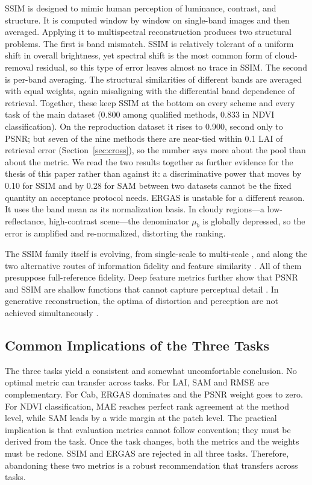 \documentclass[a4paper,fleqn]{cas-dc}
\begin{document}
SSIM is designed to mimic human perception of luminance, contrast, and structure. It is computed window by window on single-band images and then averaged. Applying it to multispectral reconstruction produces two structural problems. The first is band mismatch. SSIM is relatively tolerant of a uniform shift in overall brightness, yet spectral shift is the most common form of cloud-removal residual, so this type of error leaves almost no trace in SSIM. The second is per-band averaging. The structural similarities of different bands are averaged with equal weights, again misaligning with the differential band dependence of retrieval. Together, these keep SSIM at the bottom on every scheme and every task of the main dataset (0.800 among qualified methods, 0.833 in NDVI classification). On the reproduction dataset it rises to 0.900, second only to PSNR; but seven of the nine methods there are near-tied within 0.1 LAI of retrieval error (Section~\ref{sec:cross}), so the number says more about the pool than about the metric. We read the two results together as further evidence for the thesis of this paper rather than against it: a discriminative power that moves by 0.10 for SSIM and by 0.28 for SAM between two datasets cannot be the fixed quantity an acceptance protocol needs. ERGAS is unstable for a different reason. It uses the band mean as its normalization basis. In cloudy regions---a low-reflectance, high-contrast scene---the denominator $\mu_b$ is globally depressed, so the error is amplified and re-normalized, distorting the ranking.

The SSIM family itself is evolving, from single-scale \cite{ref27} to multi-scale \cite{ref34}, and along the two alternative routes of information fidelity \cite{ref35} and feature similarity \cite{ref36}. All of them presuppose full-reference fidelity. Deep feature metrics further show that PSNR and SSIM are shallow functions that cannot capture perceptual detail \cite{ref4}. In generative reconstruction, the optima of distortion and perception are not achieved simultaneously \cite{ref33}.

\subsection{Common Implications of the Three Tasks}

The three tasks yield a consistent and somewhat uncomfortable conclusion. No optimal metric can transfer across tasks. For LAI, SAM and RMSE are complementary. For Cab, ERGAS dominates and the PSNR weight goes to zero. For NDVI classification, MAE reaches perfect rank agreement at the method level, while SAM leads by a wide margin at the patch level. The practical implication is that evaluation metrics cannot follow convention; they must be derived from the task. Once the task changes, both the metrics and the weights must be redone. SSIM and ERGAS are rejected in all three tasks. Therefore, abandoning these two metrics is a robust recommendation that transfers across tasks.
\end{document}
